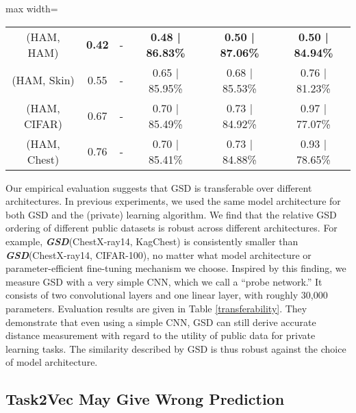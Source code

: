 \documentclass[11pt]{article}
\begin{document}
\begin{table*}[!h]
\begin{adjustbox}{max width=\textwidth}
\begin{tabular}{cc|cccc}
\multicolumn{1}{c|}{(HAM, HAM)}    & \textbf{0.42}         & -                       & \textbf{0.48 | 86.83\%} & \textbf{0.50 | 87.06\%} & \textbf{0.50 | 84.94\%} \\
\multicolumn{1}{c|}{(HAM, Skin)}   & 0.55                  & -                       & 0.65 | 85.95\%          & 0.68 | 85.53\%          & 0.76 | 81.23\%                 \\
\multicolumn{1}{c|}{(HAM, CIFAR)}  & 0.67                  & -                       & 0.70 | 85.49\%          & 0.73 | 84.92\%          & 0.97 | 77.07\%          \\
\multicolumn{1}{c|}{(HAM, Chest)}  & 0.76                  & -                       & 0.70 | 85.41\%          & 0.73 | 84.88\%          & 0.93 | 78.65\%                 \\ \hline
\end{tabular}
\label{transferability}
\end{adjustbox}
\end{table*}
Our empirical evaluation suggests that GSD is transferable over different architectures. In previous experiments, we used the same model architecture for both GSD and the (private) learning algorithm.
We find that the relative GSD ordering of different public datasets is robust across different architectures. For example, \textbf{\textit{GSD}}(ChestX-ray14, KagChest) is consistently smaller than \textbf{\textit{GSD}}(ChestX-ray14, CIFAR-100), no matter what model architecture or parameter-efficient fine-tuning mechanism we choose. Inspired by this finding, we measure GSD with a very simple CNN, which we call a ``probe network.'' It consists of two convolutional layers and one linear layer, with roughly 30,000 parameters. Evaluation results are given in Table \ref{transferability}.
They demonstrate that even using a simple CNN, GSD can still derive accurate distance measurement with regard to the utility of public data for private learning tasks. The similarity described by GSD is thus robust against the choice of model architecture. 

\subsection{Task2Vec May Give Wrong Prediction}
\end{document}
